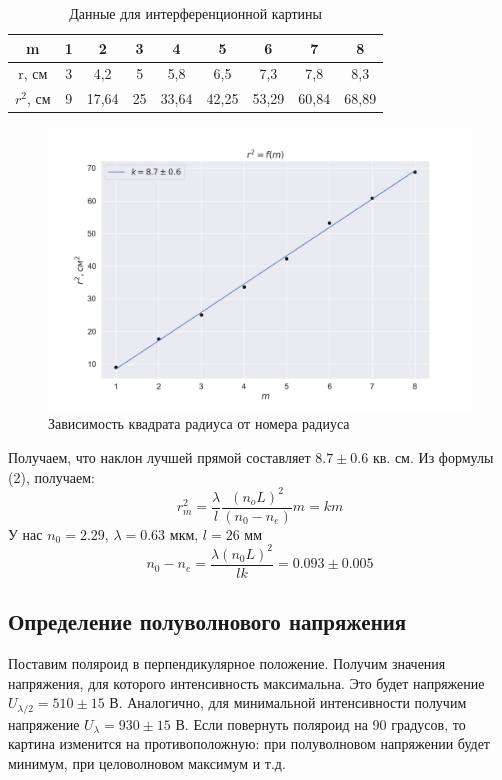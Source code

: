 \documentclass[a4paper, 12pt]{article}
\begin{document}
\begin{table}[H]
	\centering
	\begin{tabular}{|c|c|c|c|c|c|c|c|c|}
	\hline
	m         & 1 & 2     & 3  & 4     & 5     & 6     & 7     & 8     \\ \hline
	r, см     & 3 & 4,2   & 5  & 5,8   & 6,5   & 7,3   & 7,8   & 8,3   \\ \hline
	$r^2$, см & 9 & 17,64 & 25 & 33,64 & 42,25 & 53,29 & 60,84 & 68,89 \\ \hline
	\end{tabular}
	\caption{Данные для интерференционной картины}
	\label{tab:data1}
\end{table}
\begin{figure}[H]
    \centering
    \includegraphics[width=1\textwidth]{plot1.png}
    \caption{Зависимость квадрата радиуса от номера радиуса}
    \label{fig:plot1}
\end{figure}
Получаем, что наклон лучшей прямой составляет $8.7 \pm 0.6$ кв. см. Из формулы (2), получаем:
\begin{equation}
	r_m^2=\frac{\lambda}{l} \frac{\left(n_o L\right)^2}{\left(n_0-n_e\right)} m = km
\end{equation}
У нас $n_0 = 2.29$, $\lambda = 0.63$ мкм, $l = 26$ мм
\begin{equation}
	n_0 - n_e = \frac{\lambda (n_0 L)^2}{lk} = 0.093 \pm 0.005
\end{equation}
\subsection*{Определение полуволнового напряжения}
Поставим поляроид в перпендикулярное положение. Получим значения напряжения, для которого интенсивность максимальна. Это будет напряжение $U_{\lambda/2} = 510 \pm 15$ В. Аналогично, для минимальной интенсивности получим напряжение $U_{\lambda} = 930 \pm 15$ В.
Если повернуть поляроид на 90 градусов, то картина изменится на противоположную: при полуволновом напряжении будет минимум, при целоволновом максимум и т.д.
\end{document}
